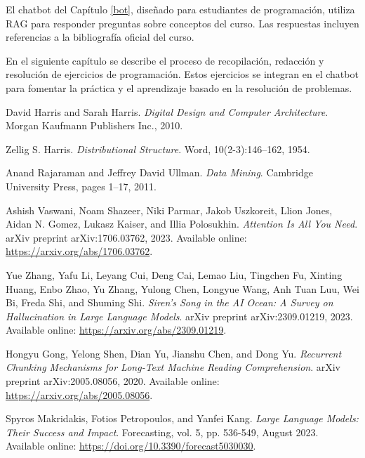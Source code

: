\documentclass{article}
\begin{document}
El chatbot del Capítulo \ref{bot}, diseñado para estudiantes de programación, utiliza RAG para responder preguntas sobre conceptos del curso. Las respuestas incluyen referencias a la bibliografía oficial del curso.

En el siguiente capítulo se describe el proceso de recopilación, redacción y resolución de ejercicios de programación. Estos ejercicios se integran en el chatbot para fomentar la práctica y el aprendizaje basado en la resolución de problemas.

\begin{thebibliography}{99}

David Harris and Sarah Harris.
\textit{Digital Design and Computer Architecture}. 
Morgan Kaufmann Publishers Inc., 2010.

Zellig S. Harris.
\textit{Distributional Structure}. 
Word, 10(2-3):146--162, 1954.

Anand Rajaraman and Jeffrey David Ullman.
\textit{Data Mining}. 
Cambridge University Press, pages 1--17, 2011.

Ashish Vaswani, Noam Shazeer, Niki Parmar, Jakob Uszkoreit, Llion Jones, Aidan N. Gomez, Lukasz Kaiser, and Illia Polosukhin. 
\textit{Attention Is All You Need}. 
arXiv preprint arXiv:1706.03762, 2023. 
Available online: \url{https://arxiv.org/abs/1706.03762}.

Yue Zhang, Yafu Li, Leyang Cui, Deng Cai, Lemao Liu, Tingchen Fu, Xinting Huang, Enbo Zhao, Yu Zhang, Yulong Chen, Longyue Wang, Anh Tuan Luu, Wei Bi, Freda Shi, and Shuming Shi. 
\textit{Siren's Song in the AI Ocean: A Survey on Hallucination in Large Language Models}. 
arXiv preprint arXiv:2309.01219, 2023. 
Available online: \url{https://arxiv.org/abs/2309.01219}.

Hongyu Gong, Yelong Shen, Dian Yu, Jianshu Chen, and Dong Yu. 
\textit{Recurrent Chunking Mechanisms for Long-Text Machine Reading Comprehension}. 
arXiv preprint arXiv:2005.08056, 2020. 
Available online: \url{https://arxiv.org/abs/2005.08056}.

Spyros Makridakis, Fotios Petropoulos, and Yanfei Kang. 
\textit{Large Language Models: Their Success and Impact}. 
Forecasting, vol. 5, pp. 536-549, August 2023. 
Available online: \url{https://doi.org/10.3390/forecast5030030}.


\end{thebibliography}
\end{document}
